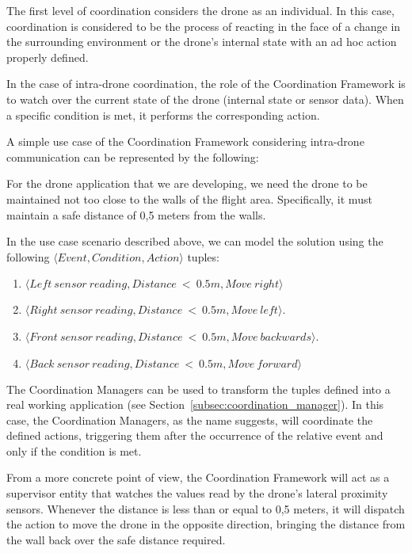 The first level of coordination considers the drone as an individual. 
In this case, coordination is considered to be the process of reacting in the face of a change in the surrounding environment or the drone's internal state with an ad hoc action properly defined.

In the case of intra-drone coordination, the role of the Coordination Framework is to watch over the current state of the drone (internal state or sensor data). 
When a specific condition is met, it performs the corresponding action.

A simple use case of the Coordination Framework considering intra-drone communication can be represented by the following:

\begin{displayquote}
    For the drone application that we are developing, we need the drone to be maintained not too close to the walls of the flight area. 
    Specifically, it must maintain a safe distance of 0,5 meters from the walls.
\end{displayquote}

In the use case scenario described above, we can model the solution using the following \( \langle Event, Condition, Action \rangle \) tuples:
\begin{enumerate}
    \item \( \langle Left~sensor~reading, Distance~<~0.5m, Move~right \rangle \)
    \item \( \langle Right~sensor~reading, Distance~<~0.5m, Move~left \rangle \).
    \item \( \langle Front~sensor~reading, Distance~<~0.5m, Move~backwards \rangle \).
    \item \( \langle Back~sensor~reading, Distance~<~0.5m, Move~forward \rangle \)
\end{enumerate}

The Coordination Managers can be used to transform the tuples defined into a real working application (see Section~\ref{subsec:coordination_manager}). 
In this case, the Coordination Managers, as the name suggests, will coordinate the defined actions, triggering them after the occurrence of the relative event and only if the condition is met.

From a more concrete point of view, the Coordination Framework will act as a supervisor entity that watches the values read by the drone's lateral proximity sensors. 
Whenever the distance is less than or equal to 0,5 meters, it will dispatch the action to move the drone in the opposite direction, bringing the distance from the wall back over the safe distance required.

